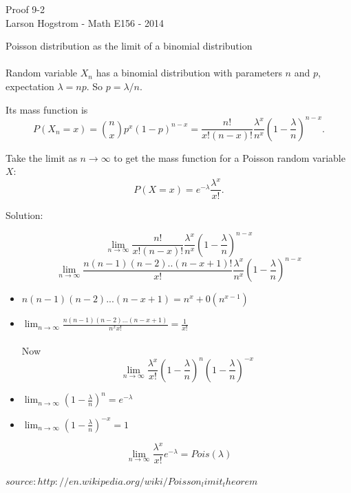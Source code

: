 \documentclass[12pt]{article}
\begin{document}
\begin{center}
Proof 9-2 \\
Larson Hogstrom - Math E156 - 2014
\end{center}



Poisson distribution as the limit of a binomial distribution

\paragraph*{}

Random variable $X_n$ has a binomial distribution with parameters $n$ and $p$, expectation $\lambda = np$. So $p = \lambda / n.$

Its mass function is $$P(X_n = x) = \binom{n}{x}p^x(1-p)^{n-x}=  \frac{n!}{x!(n-x)!} \frac{\lambda^x}{n^x} (1-\frac{\lambda}{n})^{n-x}.$$

Take the limit as $n \rightarrow \infty$ to get the mass function for a Poisson random variable $X$:
$$P(X = x) = e^{-\lambda}\frac{\lambda^x}{x!}.$$

Solution:


$$ \lim_{n\to\infty} \frac{n!}{x!(n-x)!} \frac{\lambda^x}{n^x} (1-\frac{\lambda}{n})^{n-x}$$
$$ \lim_{n\to\infty} \frac{n(n-1)(n-2)..(n-x+1)!}{x!} \frac{\lambda^x}{n^x} (1-\frac{\lambda}{n})^{n-x}$$



\begin{itemize}
\item $ n(n-1)(n-2)...(n-x + 1) =  n^x + 0(n^{x-1}) $
\item $ \lim_{n\to\infty} \frac{n(n-1)(n-2)...(n-x + 1)}{n^x x!} = \frac{1}{x!} $
\\ \\
Now
$$ \lim_{n\to\infty} \frac{\lambda^x}{x!} (1-\frac{\lambda}{n})^{n}(1-\frac{\lambda}{n})^{-x}$$

\item $ \lim_{n\to\infty} (1 - \frac{\lambda}{n})^n = e^{-\lambda}$
\item $ \lim_{n\to\infty} (1 - \frac{\lambda}{n})^{-x} = 1$
\end{itemize}
$$ \lim_{n\to\infty} \frac{\lambda^x}{x!} e^{-\lambda} = Pois(\lambda) $$ 

\paragraph*{}
$ source: http://en.wikipedia.org/wiki/Poisson_limit_theorem $
\end{document}
